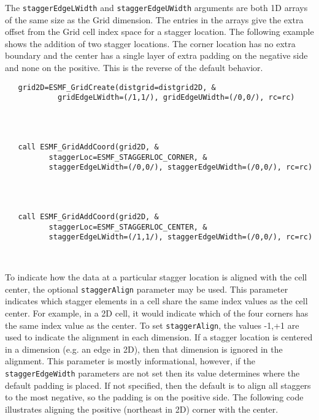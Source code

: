    The {\tt staggerEdgeLWidth} and
   {\tt staggerEdgeUWidth} arguments are both 1D arrays of the
   same size as the Grid dimension. The entries in the arrays
   give the extra offset from the Grid cell index space
   for a stagger location. The following example shows the
   addition of two stagger locations. The
   corner location has no extra boundary and the
   center has a single layer of extra padding on
   the negative side and none on the positive.  This is the reverse of
   the default behavior. 

 \begin{verbatim}
   grid2D=ESMF_GridCreate(distgrid=distgrid2D, &
            gridEdgeLWidth=(/1,1/), gridEdgeUWidth=(/0,0/), rc=rc)
 
\end{verbatim}
 

 \begin{verbatim}


   call ESMF_GridAddCoord(grid2D, &
          staggerLoc=ESMF_STAGGERLOC_CORNER, &
          staggerEdgeLWidth=(/0,0/), staggerEdgeUWidth=(/0,0/), rc=rc)
 
\end{verbatim}
 

 \begin{verbatim}


   call ESMF_GridAddCoord(grid2D, &
          staggerLoc=ESMF_STAGGERLOC_CENTER, &
          staggerEdgeLWidth=(/1,1/), staggerEdgeUWidth=(/0,0/), rc=rc)

 
\end{verbatim}
 

   To indicate how the data at a particular stagger location is aligned with the
   cell center, the optional {\tt staggerAlign} parameter
   may be used. This parameter indicates which stagger elements
   in a cell share the same index values as the cell center.
   For example, in a 2D cell, it would indicate which of the four corners has
   the same index value as the center. To set {\tt staggerAlign},
   the values -1,+1 are used to indicate the alignment in
   each dimension. If a stagger location is
   centered in a dimension (e.g. an edge in 2D), then that
   dimension is ignored in the alignment. This parameter is mostly
   informational, however, if the {\tt staggerEdgeWidth} parameters
   are not set then its value determines where the default padding
   is placed. If not specified, then the default is to align all
   staggers to the most negative, so the padding is on the positive side.
   The following code illustrates aligning the positive (northeast in 2D)
   corner with the center. 


